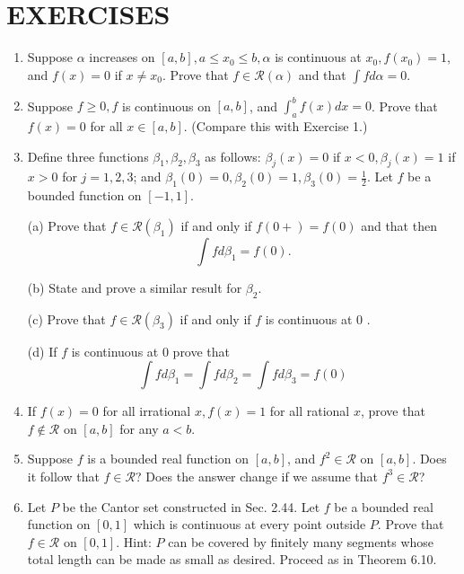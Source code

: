 \documentclass[10pt]{article}
\begin{document}
\section*{EXERCISES}
\begin{enumerate}
  \item Suppose $\alpha$ increases on $[a, b], a \leq x_{0} \leq b, \alpha$ is continuous at $x_{0}, f\left(x_{0}\right)=1$, and $f(x)=0$ if $x \neq x_{0}$. Prove that $f \in \mathscr{R}(\alpha)$ and that $\int f d \alpha=0$.

  \item Suppose $f \geq 0, f$ is continuous on $[a, b]$, and $\int_{a}^{b} f(x) d x=0$. Prove that $f(x)=0$ for all $x \in[a, b]$. (Compare this with Exercise 1.)

  \item Define three functions $\beta_{1}, \beta_{2}, \beta_{3}$ as follows: $\beta_{j}(x)=0$ if $x<0, \beta_{j}(x)=1$ if $x>0$ for $j=1,2,3$; and $\beta_{1}(0)=0, \beta_{2}(0)=1, \beta_{3}(0)=\frac{1}{2}$. Let $f$ be a bounded function on $[-1,1]$.

  (a) Prove that $f \in \mathscr{R}\left(\beta_{1}\right)$ if and only if $f(0+)=f(0)$ and that then
  $$
  \int f d \beta_{1}=f(0) .
  $$

  (b) State and prove a similar result for $\beta_{2}$.

  (c) Prove that $f \in \mathscr{R}\left(\beta_{3}\right)$ if and only if $f$ is continuous at 0 .

  (d) If $f$ is continuous at 0 prove that
  $$
  \int f d \beta_{1}=\int f d \beta_{2}=\int f d \beta_{3}=f(0)
  $$

  \item If $f(x)=0$ for all irrational $x, f(x)=1$ for all rational $x$, prove that $f \notin \mathscr{R}$ on $[a, b]$ for any $a<b$.

  \item Suppose $f$ is a bounded real function on $[a, b]$, and $f^{2} \in \mathscr{R}$ on $[a, b]$. Does it follow that $f \in \mathscr{R}$? Does the answer change if we assume that $f^{3} \in \mathscr{R}$?

  \item Let $P$ be the Cantor set constructed in Sec. 2.44. Let $f$ be a bounded real function on $[0,1]$ which is continuous at every point outside $P$. Prove that $f \in \mathscr{R}$ on $[0,1]$. Hint: $P$ can be covered by finitely many segments whose total length can be made as small as desired. Proceed as in Theorem 6.10.


\end{enumerate}
\end{document}
